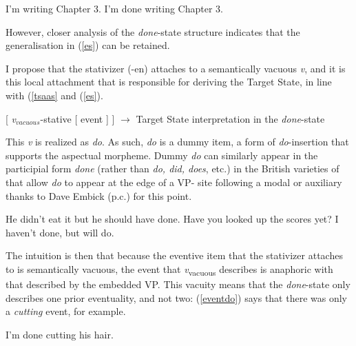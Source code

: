 \documentclass[output=paper,modfonts,nonflat]{langsci/langscibook}
\begin{document}
 \begin{exe}
\ex\label{progdrs}
\begin{xlist}
\ex  I'm writing Chapter 3.
\ex  I'm done writing Chapter 3.
\end{xlist}
\end{exe}



However, closer analysis of the \emph{done}-state structure indicates that the generalisation in (\ref{es}) can be retained.

I propose that the stativizer (-en) attaches to a semantically vacuous \emph{v}, and it is this local attachment that is responsible for deriving the Target State, in line with (\ref{tsaas} and (\ref{es}).

\begin{exe}
\ex\label{dsts}  {[ \emph{v}$_{vacuous}$-stative  [ event ] ]} $\rightarrow$ Target State interpretation in the \emph{done}-state
\end{exe}

This \emph{v} is realized as \emph{do}. As such, \emph{do} is a dummy item, a
form of \emph{do}-insertion that supports the aspectual morpheme. Dummy
\emph{do} can similarly appear in the participial form \emph{done} (rather than
\emph{do, did, does}, etc.) in the British varieties of  that
allow \emph{do} to appear at the edge of a VP- site following a modal or auxiliary thanks to Dave Embick (p.c.) for this point.



\begin{exe}
\ex
\begin{xlist}
\ex He didn't eat it but he should have done.
\ex Have you looked up the scores yet? I haven't done, but will do.
\end{xlist}
\end{exe}



The intuition is then that because the eventive item that the stativizer
attaches to is semantically vacuous, the event that
\emph{v}\textsubscript{vacuous} describes is anaphoric with that described by
the embedded VP\@. This vacuity means that the \emph{done}-state only describes
one prior eventuality, and not two: (\ref{eventdo}) says that there was only a
\emph{cutting} event, for example.


\begin{exe}
\ex\label{eventdo} I'm done cutting his hair.
\end{exe}
\end{document}
